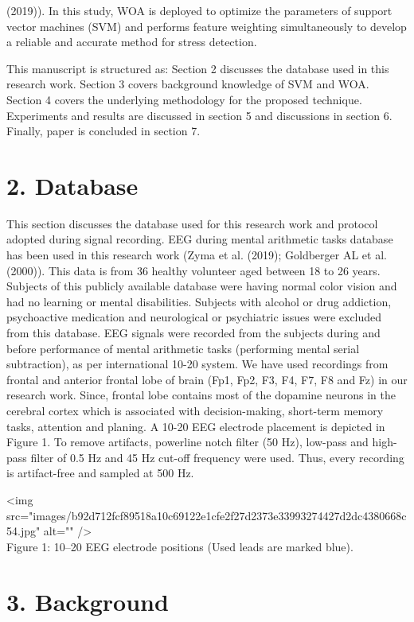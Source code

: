 \documentclass{article}
\begin{document}
(2019)). In this study, WOA is deployed to optimize the parameters of support vector machines (SVM) and performs feature weighting simultaneously to develop a reliable and accurate method for stress detection.

This manuscript is structured as: Section 2 discusses the database used in this research work. Section 3 covers background knowledge of SVM and WOA. Section 4 covers the underlying methodology for the proposed technique. Experiments and results are discussed in section 5 and discussions in section 6. Finally, paper is concluded in section 7.

\section{2. Database}

This section discusses the database used for this research work and protocol adopted during signal recording. EEG during mental arithmetic tasks database has been used in this research work (Zyma et al. (2019); Goldberger AL et al. (2000)). This data is from 36 healthy volunteer aged between 18 to 26 years. Subjects of this publicly available database were having normal color vision and had no learning or mental disabilities. Subjects with alcohol or drug addiction, psychoactive medication and neurological or psychiatric issues were excluded from this database. EEG signals were recorded from the subjects during and before performance of mental arithmetic tasks (performing mental serial subtraction), as per international 10-20 system. We have used recordings from frontal and anterior frontal lobe of brain (Fp1, Fp2, F3, F4, F7, F8 and Fz) in our research work. Since, frontal lobe contains most of the dopamine neurons in the cerebral cortex which is associated with decision-making, short-term memory tasks, attention and planing. A 10-20 EEG electrode placement is depicted in Figure 1. To remove artifacts, powerline notch filter (50 Hz), low-pass and high-pass filter of 0.5 $\mathrm{Hz}$ and 45 Hz cut-off frequency were used. Thus, every recording is artifact-free and sampled at 500 Hz.

<img src="images/b92d712fcf89518a10c69122e1cfe2f27d2373e33993274427d2dc4380668c54.jpg" alt="" />\\
Figure 1: 10–20 EEG electrode positions (Used leads are marked blue).

\section{3. Background}
\end{document}
